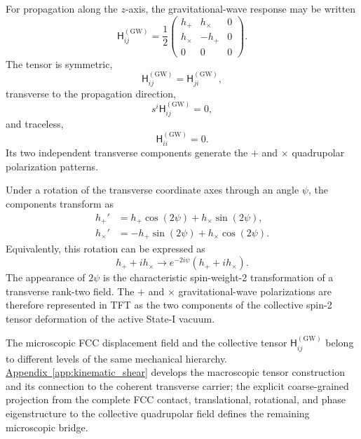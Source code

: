 For propagation along the $z$-axis, the gravitational-wave response may be written
\begin{equation}
    \mathsf{H}_{ij}^{(\mathrm{GW})} = \frac{1}{2}
    \begin{pmatrix}
        h_{+} & h_{\times} & 0 \\
        h_{\times} & -h_{+} & 0 \\
        0 & 0 & 0
    \end{pmatrix}.
\end{equation}
The tensor is symmetric,
\begin{equation}
    \mathsf{H}_{ij}^{(\mathrm{GW})} = \mathsf{H}_{ji}^{(\mathrm{GW})},
\end{equation}
transverse to the propagation direction,
\begin{equation}
    s^{i} \mathsf{H}_{ij}^{(\mathrm{GW})} = 0,
\end{equation}
and traceless,
\begin{equation}
    \mathsf{H}_{ii}^{(\mathrm{GW})} = 0.
\end{equation}
Its two independent transverse components generate the $+$ and $\times$ quadrupolar polarization patterns.

Under a rotation of the transverse coordinate axes through an angle $\psi$, the components transform as
\begin{align}
    h_{+}' &= h_{+}\cos(2\psi) + h_{\times}\sin(2\psi), \\
    h_{\times}' &= -h_{+}\sin(2\psi) + h_{\times}\cos(2\psi).
\end{align}
Equivalently, this rotation can be expressed as
\begin{equation}
    h_{+} + i h_{\times} \longrightarrow e^{-2i\psi} \left(h_{+} + i h_{\times}\right).
\end{equation}
The appearance of $2\psi$ is the characteristic spin-weight-2 transformation of a transverse rank-two field. The $+$ and $\times$ gravitational-wave polarizations are therefore represented in TFT as the two components of the collective spin-2 tensor deformation of the active State-I vacuum.

The microscopic FCC displacement field and the collective tensor $\mathsf{H}_{ij}^{(\mathrm{GW})}$ belong to different levels of the same mechanical hierarchy. \hyperref[app:kinematic_shear]{Appendix~\ref*{app:kinematic_shear}} develops the macroscopic tensor construction and its connection to the coherent transverse carrier; the explicit coarse-grained projection from the complete FCC contact, translational, rotational, and phase eigenstructure to the collective quadrupolar field defines the remaining microscopic bridge.

